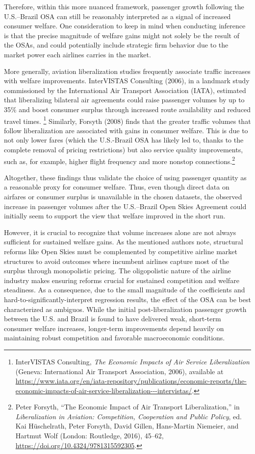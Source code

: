 \documentclass[12pt]{article}
\begin{document}
Therefore, within this more nuanced framework, passenger growth following the U.S.–Brazil OSA can still be reasonably interpreted as a signal of increased consumer welfare. One consideration to keep in mind when conducting inference is that the precise magnitude of welfare gains might not solely be the result of the OSAs, and could potentially include strategic firm behavior due to the market power each airlines carries in the market.

More generally, aviation liberalization studies  frequently associate traffic increases with welfare improvements. InterVISTAS Consulting (2006), in a landmark study commissioned by the International Air Transport Association (IATA), estimated that liberalizing bilateral air agreements could raise passenger volumes by up to 35\% and boost consumer surplus through increased route availability and reduced travel times. \footnote{InterVISTAS Consulting, \textit{The Economic Impacts of Air Service Liberalization} (Geneva: International Air Transport Association, 2006), available at \url{https://www.iata.org/en/iata-repository/publications/economic-reports/the-economic-impacts-of-air-service-liberalization---intervistas/}.} Similarly, Forsyth (2008) finds that the greater traffic volumes that follow liberalization are associated with gains in consumer welfare. This is due to not only lower fares (which the U.S.-Brazil OSA has likely led to, thanks to the complete removal of pricing restrictions) but also service quality improvements, such as, for example, higher flight frequency and more nonstop connections.\footnote{Peter Forsyth, “The Economic Impact of Air Transport Liberalization,” in \textit{Liberalization in Aviation: Competition, Cooperation and Public Policy}, ed. Kai Hüschelrath, Peter Forsyth, David Gillen, Hans-Martin Niemeier, and Hartmut Wolf (London: Routledge, 2016), 45–62, \url{https://doi.org/10.4324/9781315592305}.}

Altogether, these findings thus validate the choice of using passenger quantity as a reasonable proxy for consumer welfare. Thus, even though direct data on airfares or consumer surplus is unavailable in the chosen datasets, the observed increase in passenger volumes after the U.S.–Brazil Open Skies Agreement could initially seem to support the view that welfare improved in the short run. 

However, it is crucial to recognize that volume increases alone are not always sufficient for sustained welfare gains. As the mentioned authors note, structural reforms like Open Skies must be complemented by competitive airline market structures to avoid outcomes where incumbent airlines capture most of the surplus through monopolistic pricing. The oligopolistic nature of the airline industry makes ensuring reforms crucial for sustained competition and welfare steadiness. As a consequence, due to the small magnitude of the coefficients and hard-to-significantly-interpret regression results, the effect of the OSA can be best characterized as ambiguos. While the initial post-liberalization passenger growth between the U.S. and Brazil is found to have delivered weak, short-term consumer welfare increases, longer-term improvements depend heavily on maintaining robust competition and favorable macroeconomic conditions.
\end{document}
